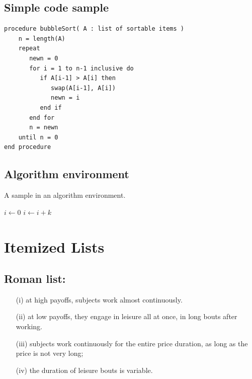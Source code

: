 \documentclass[NETN,manuscript]{stjour-new}
\begin{document}
\subsection{Simple code sample}

\begin{code}
\begin{verbatim}
procedure bubbleSort( A : list of sortable items )
    n = length(A)
    repeat
       newn = 0
       for i = 1 to n-1 inclusive do
          if A[i-1] > A[i] then
             swap(A[i-1], A[i])
             newn = i
          end if
       end for
       n = newn
    until n = 0
end procedure
\end{verbatim}
\end{code}


\subsection{Algorithm environment}

\begin{algorithm}[h]
\caption{A sample in an algorithm environment.}
\begin{algorithmic}
    \State $i\gets 0$
\Else
        \State $i\gets i+k$
    \EndIf
\EndIf
\end{algorithmic}
\end{algorithm}


\section{Itemized Lists}

\subsection{Roman list:}

\begin{enumerate}
\item[(i)] at high 
payoffs, subjects work almost continuously.
\item[(ii)] at low payoffs, they 
engage in leisure all at once, in long bouts after working.
\item[(iii)] subjects work continuously for the entire price duration, as long as
the price is not very long;
\item[(iv)] the duration of leisure bouts is variable.
\end{enumerate}
\end{document}

